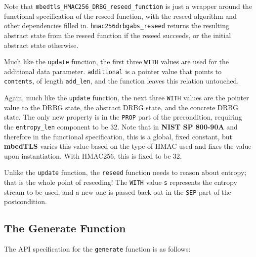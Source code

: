 \documentclass[pageno]{jpaper}
\newcommand{\stdtitle}[1]{\textbf{#1}}
\begin{document}
Note that \lstinline{mbedtls_HMAC256_DRBG_reseed_function} is just a wrapper around the functional specification of the reseed function, with the reseed algorithm and other dependencies filled in. \lstinline{hmac256drbgabs_reseed} returns the resulting abstract state from the reseed function if the reseed succeeds, or the initial abstract state otherwise.

Much like the \lstinline{update} function, the first three \lstinline{WITH} values are used for the additional data parameter. \lstinline{additional} is a pointer value that points to \lstinline{contents}, of length \lstinline{add_len}, and the function leaves this relation untouched.

Again, much like the \lstinline{update} function, the next three \lstinline{WITH} values are the pointer value to the DRBG state, the abstract DRBG state, and the concrete DRBG state. The only new property is in the \lstinline{PROP} part of the precondition, requiring the \lstinline{entropy_len} component to be 32. Note that in \stdtitle{NIST SP 800-90A} and therefore in the functional specification, this is a global, fixed constant, but \stdtitle{mbedTLS} varies this value based on the type of HMAC used and fixes the value upon instantiation. With HMAC256, this is fixed to be 32.

Unlike the \lstinline{update} function, the \lstinline{reseed} function needs to reason about entropy; that is the whole point of reseeding! The \lstinline{WITH} value \lstinline{s} represents the entropy stream to be used, and a new one is passed back out in the \lstinline{SEP} part of the postcondition.

\subsection{The Generate Function}

The API specification for the \lstinline{generate} function is as follows:
\end{document}
